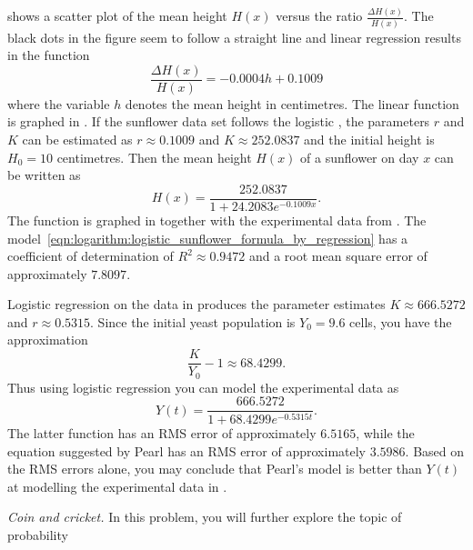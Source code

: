 \documentclass[a4paper,oneside,12pt]{article}
\begin{document}
\begin{problem}
{\begin{solution}
 shows a scatter
plot of the mean height $H(x)$ versus the ratio
$\frac{\Delta H(x)}{H(x)}$.  The black dots in the figure seem to
follow a straight line and linear regression results in the function
\begin{equation}
\label{eqn:logarithm:logistic_sunflower_regression}
\frac{\Delta H(x)}{H(x)}
=
-0.0004 h + 0.1009
\end{equation}
where the variable $h$ denotes the mean height in centimetres.  The
linear function is graphed in
.  If the
sunflower data set follows the logistic
, the parameters
$r$ and $K$ can be estimated as $r \approx 0.1009$ and
$K \approx 252.0837$ and the initial height is $H_0 = 10$ centimetres.
Then the mean height $H(x)$ of a sunflower on day $x$ can be written
as
\begin{equation}
\label{eqn:logarithm:logistic_sunflower_formula_by_regression}
H(x)
=
\frac{
  252.0837
}{
  1 + 24.2083 e^{-0.1009 x}
}.
\end{equation}
The function is graphed in  together
with the experimental data from .  The
model~\eqref{eqn:logarithm:logistic_sunflower_formula_by_regression}
has a coefficient of determination of $R^2 \approx 0.9472$ and a root
mean square error of approximately $7.8097$.

Logistic regression on the data in 
produces the parameter estimates $K \approx 666.5272$ and
$r \approx 0.5315$.  Since the initial yeast population is
$Y_0 = 9.6$ cells, you have the approximation
\[
\frac{K}{Y_0} - 1
\approx
68.4299.
\]
Thus using logistic regression you can model the experimental data as
\[
Y(t)
=
\frac{
  666.5272
}{
  1 + 68.4299 e^{-0.5315 t}
}.
\]
The latter function has an RMS error of approximately $6.5165$, while
the equation suggested by Pearl has an RMS error of approximately
$3.5986$.  Based on the RMS errors alone, you may conclude that
Pearl's model is better than $Y(t)$ at modelling the experimental data
in .
\end{solution}
}{}

\begin{table}[!htbp]
\centering

\caption{%
  The observed population size in an experimental colony of yeast.
  The data are due to T.~Carlson, published in~1913.  The ``Hour''
  column lists the numbers of hours that the population had been
  allowed to grow.  The ``Observed'' column lists the count of the
  number of yeast cells that were found in the colony after a given
  number of hours.
}
\label{tab:logarithm:yeast}
\end{table}

\item\emph{Coin and cricket.}
  In this problem, you will further explore the topic of probability
\end{problem}
\end{document}
